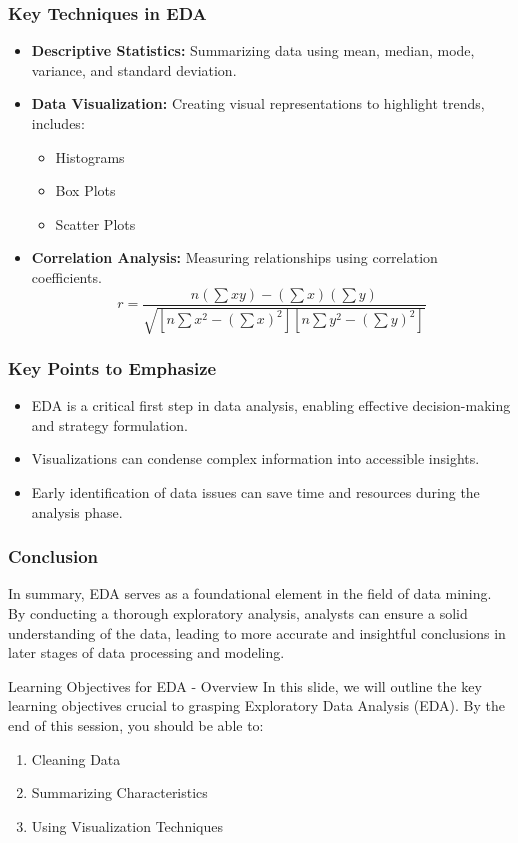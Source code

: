 \documentclass[aspectratio=169]{beamer}
\begin{document}
\begin{frame}[fragile]
    \frametitle{Key Techniques in EDA}
    \begin{itemize}
        \item \textbf{Descriptive Statistics:} Summarizing data using mean, median, mode, variance, and standard deviation.
        \item \textbf{Data Visualization:} Creating visual representations to highlight trends, includes:
            \begin{itemize}
                \item Histograms
                \item Box Plots
                \item Scatter Plots
            \end{itemize}
        \item \textbf{Correlation Analysis:} Measuring relationships using correlation coefficients.
            \begin{equation}
                r = \frac{n(\sum xy) - (\sum x)(\sum y)}{\sqrt{[n \sum x^2 - (\sum x)^2][n \sum y^2 - (\sum y)^2]}}
            \end{equation}
    \end{itemize}
\end{frame}

\begin{frame}[fragile]
    \frametitle{Key Points to Emphasize}
    \begin{itemize}
        \item EDA is a critical first step in data analysis, enabling effective decision-making and strategy formulation.
        \item Visualizations can condense complex information into accessible insights.
        \item Early identification of data issues can save time and resources during the analysis phase.
    \end{itemize}
\end{frame}

\begin{frame}[fragile]
    \frametitle{Conclusion}
    In summary, EDA serves as a foundational element in the field of data mining. By conducting a thorough exploratory analysis, analysts can ensure a solid understanding of the data, leading to more accurate and insightful conclusions in later stages of data processing and modeling.
\end{frame}

\begin{frame}[fragile]{Learning Objectives for EDA - Overview}
    In this slide, we will outline the key learning objectives crucial to grasping Exploratory Data Analysis (EDA). By the end of this session, you should be able to:
    \begin{enumerate}
        \item Cleaning Data
        \item Summarizing Characteristics
        \item Using Visualization Techniques
    \end{enumerate}
\end{frame}
\end{document}
